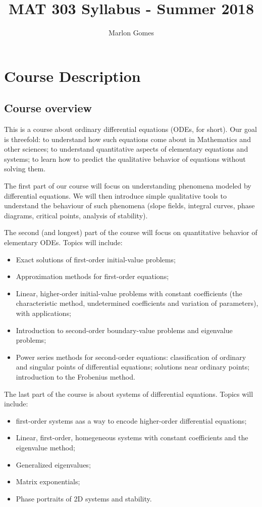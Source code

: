 \documentclass[11pt]{amsart}
\title[MAT 303 Syllabus - Summer 2018]{MAT 303 Syllabus - Summer 2018}
\author[M. Gomes]{Marlon Gomes}
\numberwithin{equation}{section}
\begin{document}
\maketitle

\section{Course Description}
\subsection{Course overview}
 This is a course about ordinary differential equations (ODEs, for short). Our goal is threefold: to understand how such equations come about in Mathematics and other sciences; to understand quantitative aspects of elementary equations and systems; to learn how to predict the qualitative behavior of equations without solving them.
 
      The first part of our course will focus on understanding phenomena modeled by differential equations. We will then introduce simple qualitative tools to understand the behaviour of such phenomena (slope fields, integral curves, phase diagrams, critical points, analysis of stability). 
      
      The second (and longest) part of the course will focus on quantitative behavior of elementary ODEs. Topics will include:
\begin{itemize}
  \item Exact solutions of first-order initial-value problems; 
  \item Approximation methods for first-order equations; 
  \item Linear, higher-order initial-value problems with constant coefficients (the characteristic method, undetermined coefficients and variation of parameters), with applications; 
  \item Introduction to second-order boundary-value problems and eigenvalue problems; 
  \item Power series methods for second-order equations: classification of ordinary and singular points of differential equations; solutions near ordinary points; introduction to the Frobenius method. 
\end{itemize}    

The last part of the course is about systems of differential equations. Topics will include:
\begin{itemize}
\item first-order systems aas a way to encode higher-order differential equations; 
\item Linear, first-order, homegeneous systems with constant coefficients and the eigenvalue method; 
\item Generalized eigenvalues; 
\item Matrix exponentials; 
\item Phase portraits of 2D systems and stability.
\end{itemize}
\end{document}
